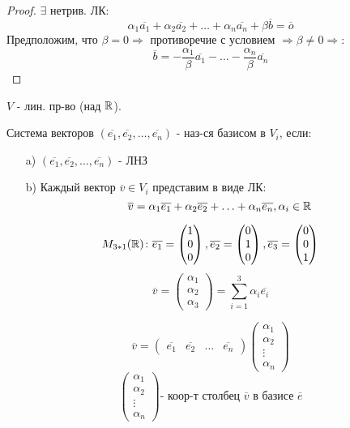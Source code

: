 \begin{proof}
$\exists $ нетрив. ЛК:
\[
\alpha_1 \overline{a_1} + \alpha_2 \overline{a_2} + \ldots + \alpha_n \overline{a_n} + \beta \overline{b} = \overline{o}
\] 
Предположим, что $\beta = 0 \Rightarrow $ противоречие с условием $\Rightarrow \beta \neq 0 \Rightarrow$:
\[
\overline{b} = -\frac{\alpha_1}{\beta} \overline{a_1} - \ldots - \frac{\alpha_n}{\beta} \overline{a_n}
\] 
\end{proof}
\begin{definition}
$V$ - лин. пр-во (над $\mathbb{R}$). 

Система векторов $(\overline{e_1}, \overline{e_2}, \ldots, \overline{e_n})$ - наз-ся базисом в $V_i$, если:
\begin{itemize}
    \item [a) ]$(\overline{e_1}, \overline{e_2}, \ldots, \overline{e_n})$ - ЛНЗ 
    \item [b) ] Каждый вектор $\overline{v} \in V_i$ представим в виде ЛК:
        \[
        \overline{v} = \alpha_1 \overline{e_1} + \alpha_2 \overline{e_2} + \ldots + \alpha_n \overline{e_n}, \alpha_i \in \mathbb{R}
        \] 
\end{itemize}
\end{definition}
\begin{example}
\[
M_{3 * 1}(\mathbb{R})\colon  \overline{e_1} = \begin{pmatrix}1 \\ 0 \\ 0 \end{pmatrix}, \overline{e_2} = \begin{pmatrix}0 \\ 1 \\ 0 \end{pmatrix}, \overline{e_3} = \begin{pmatrix}0 \\ 0 \\ 1 \end{pmatrix}
\] 
\[
\overline{v} = \begin{pmatrix}\alpha_1 \\ \alpha_2 \\ \alpha_3 \end{pmatrix} = \sum_{i = 1}^{3}  \alpha_i \overline{e_i}
\] 
\end{example}
\begin{note}
    \[
        \overline{v} = \begin{pmatrix}\overline{e_1} & \overline{e_2} & \ldots & \overline{e_n} \end{pmatrix} \begin{pmatrix}\alpha_1 \\ \alpha_2 \\ \vdots \\ \alpha_n \end{pmatrix}
    \] 
    \[
    \begin{pmatrix}\alpha_1 \\ \alpha_2 \\ \vdots \\ \alpha_n \end{pmatrix} \text{- коор-т столбец $\overline{v}$ в базисе $\overline{e}$}
    \] 
\end{note}
